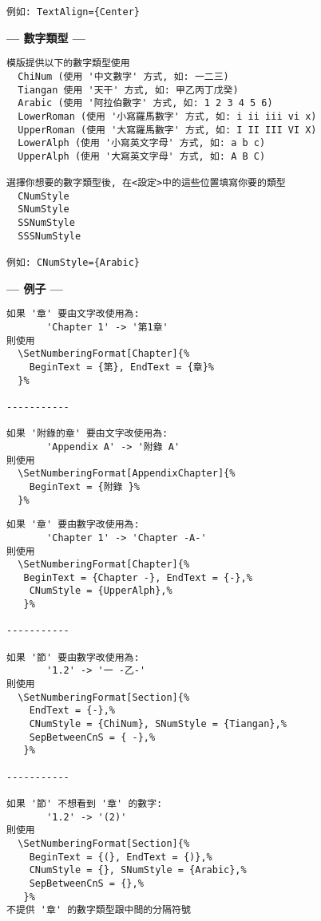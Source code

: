 \begin{enumerate}
{\begin{DescriptionFrame}
\begin{verbatim}
例如: TextAlign={Center}
    \end{verbatim}
    \end{DescriptionFrame}

  \newpage
    \textbf{--- 數字類型 ---}
    \begin{DescriptionFrame}
    \begin{verbatim}
模版提供以下的數字類型使用
  ChiNum (使用 '中文數字' 方式, 如: 一二三)
  Tiangan 使用 '天干' 方式, 如: 甲乙丙丁戊癸)
  Arabic (使用 '阿拉伯數字' 方式, 如: 1 2 3 4 5 6)
  LowerRoman (使用 '小寫羅馬數字' 方式, 如: i ii iii vi x)
  UpperRoman (使用 '大寫羅馬數字' 方式, 如: I II III VI X)
  LowerAlph (使用 '小寫英文字母' 方式, 如: a b c)
  UpperAlph (使用 '大寫英文字母' 方式, 如: A B C)

選擇你想要的數字類型後, 在<設定>中的這些位置填寫你要的類型
  CNumStyle
  SNumStyle
  SSNumStyle
  SSSNumStyle

例如: CNumStyle={Arabic}
    \end{verbatim}
    \end{DescriptionFrame}

    \textbf{--- 例子 ---}
    \begin{DescriptionFrame}
    \begin{verbatim}
如果 '章' 要由文字改使用為:
       'Chapter 1' -> '第1章'
則使用
  \SetNumberingFormat[Chapter]{%
    BeginText = {第}, EndText = {章}%
  }%

-----------

如果 '附錄的章' 要由文字改使用為:
       'Appendix A' -> '附錄 A'
則使用
  \SetNumberingFormat[AppendixChapter]{%
    BeginText = {附錄 }%
  }%
    \end{verbatim}
    \end{DescriptionFrame}

    \begin{DescriptionFrame}
    \begin{verbatim}
如果 '章' 要由數字改使用為:
       'Chapter 1' -> 'Chapter -A-'
則使用
  \SetNumberingFormat[Chapter]{%
   BeginText = {Chapter -}, EndText = {-},%
    CNumStyle = {UpperAlph},%
   }%

-----------

如果 '節' 要由數字改使用為:
       '1.2' -> '一 -乙-'
則使用
  \SetNumberingFormat[Section]{%
    EndText = {-},%
    CNumStyle = {ChiNum}, SNumStyle = {Tiangan},%
    SepBetweenCnS = { -},%
   }%

-----------

如果 '節' 不想看到 '章' 的數字:
       '1.2' -> '(2)'
則使用
  \SetNumberingFormat[Section]{%
    BeginText = {(}, EndText = {)},%
    CNumStyle = {}, SNumStyle = {Arabic},%
    SepBetweenCnS = {},%
   }%
不提供 '章' 的數字類型跟中間的分隔符號
    \end{verbatim}
    \end{DescriptionFrame}

}
\end{enumerate}
